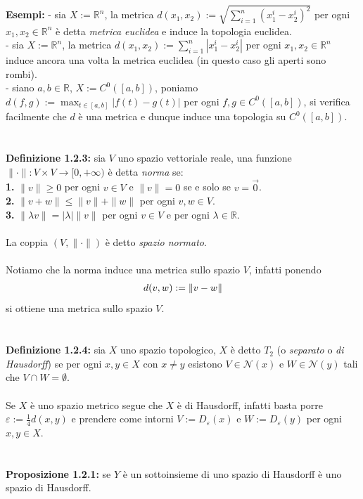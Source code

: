 \documentclass{article}
\begin{document}
\textbf{Esempi:} - sia $X := \mathbb{R}^n$, la metrica $d(x_1, x_2) := \sqrt{\sum_{i = 1}^n (x_1^i - x_2^i)^2}$ per ogni $x_1, x_2 \in \mathbb{R}^n$ è detta \textit{metrica euclidea} e induce la topologia euclidea. \\
- sia $X := \mathbb{R}^n$, la metrica $d(x_1, x_2) := \sum_{i = 1}^n |x_1^i - x_2^i|$ per ogni $x_1, x_2 \in \mathbb{R}^n$ induce ancora una volta la metrica euclidea (in questo caso gli aperti sono rombi). \\
- siano $a, b \in \mathbb{R}$, $X := C^0([a, b])$, poniamo $d(f, g) := \max_{t \in [a, b]} |f(t) - g(t)|$ per ogni $f, g \in C^0([a, b])$, si verifica facilmente che $d$ è una metrica e dunque induce una topologia su $C^0([a, b])$. \\ \\ \\
\textbf{Definizione 1.2.3:} sia $V$ uno spazio vettoriale reale, una funzione $\| \cdot \| : V \times V \longrightarrow [0, +\infty)$ è detta \textit{norma} se: \\
\textbf{1.} $\| v \| \geq 0$ per ogni $v \in V$ e $\| v \| = 0$ se e solo se $v = \vec{0}$. \\
\textbf{2.} $\| v + w \| \leq \| v \| + \| w \|$ per ogni $v, w \in V$. \\
\textbf{3.} $\| \lambda v \| = |\lambda| \| v \|$ per ogni $v \in V$ e per ogni $\lambda \in \mathbb{R}$. \\ \\
La coppia $(V, \| \cdot \|)$ è detto \textit{spazio normato}. \\ \\
Notiamo che la norma induce una metrica sullo spazio $V$, infatti ponendo
\begin{gather}
    d(v, w) := \|v - w\| \notag
\end{gather}
si ottiene una metrica sullo spazio $V$. \\ \\ \\
\textbf{Definizione 1.2.4:} sia $X$ uno spazio topologico, $X$ è detto $T_2$ (o \textit{separato} o \textit{di Hausdorff}) se per ogni $x, y \in X$ con $x \neq y$ esistono $V \in \mathcal{N}(x)$ e $W \in \mathcal{N}(y)$ tali che $V \cap W = \emptyset$. \\ \\
Se $X$ è uno spazio metrico segue che $X$ è di Hausdorff, infatti basta porre $\varepsilon := \frac{1}{4}d(x, y)$ e prendere come intorni $V := D_\varepsilon(x)$ e $W := D_\varepsilon(y)$ per ogni $x, y \in X$. \\ \\ \\
\textbf{Proposizione 1.2.1:} se $Y$ è un sottoinsieme di uno spazio di Hausdorff è uno spazio di Hausdorff. \\
\end{document}
